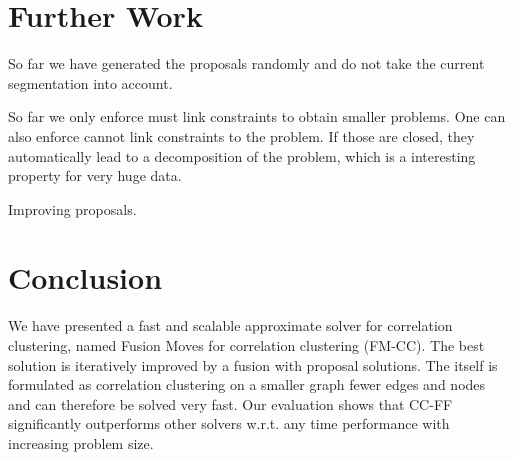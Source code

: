 \documentclass[10pt,twocolumn,letterpaper]{article}
\begin{document}



% 



%


\section{Further Work}\label{sec:future}
So far we have generated the proposals randomly and do not take the current segmentation into account.

So far we only enforce must link constraints to obtain smaller problems.
One can also enforce cannot link constraints to the problem. 
If those are closed, they automatically lead to a decomposition of the problem, 
which is a interesting property for very huge data.

Improving proposals.




\section{Conclusion}\label{sec:conclusion}

We have presented a fast and scalable 
approximate solver for correlation 
clustering, named Fusion Moves for correlation clustering (FM-CC).
The best solution is iteratively improved 
by a fusion with proposal solutions.
The itself is formulated as correlation
clustering on a smaller graph fewer edges and nodes
and can therefore be solved very fast.
Our evaluation shows that CC-FF
significantly outperforms 
other solvers w.r.t. any time performance 
with increasing problem size.


    


\newpage

\FloatBarrier
{\small


}



% 
% 
% 
% 
% 
% 
% 
\end{document}
